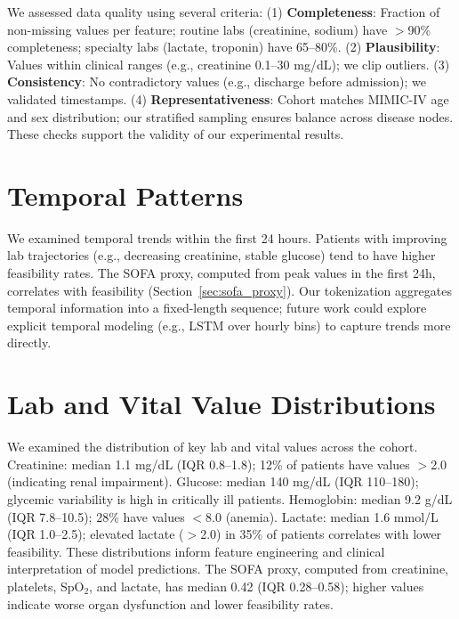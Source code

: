 We assessed data quality using several criteria: (1) \textbf{Completeness}: Fraction of non-missing values per feature; routine labs (creatinine, sodium) have $>$90\% completeness; specialty labs (lactate, troponin) have 65--80\%. (2) \textbf{Plausibility}: Values within clinical ranges (e.g., creatinine 0.1--30 mg/dL); we clip outliers. (3) \textbf{Consistency}: No contradictory values (e.g., discharge before admission); we validated timestamps. (4) \textbf{Representativeness}: Cohort matches MIMIC-IV age and sex distribution; our stratified sampling ensures balance across disease nodes. These checks support the validity of our experimental results.

\section{Temporal Patterns}

We examined temporal trends within the first 24 hours. Patients with improving lab trajectories (e.g., decreasing creatinine, stable glucose) tend to have higher feasibility rates. The SOFA proxy, computed from peak values in the first 24h, correlates with feasibility (Section~\ref{sec:sofa_proxy}). Our tokenization aggregates temporal information into a fixed-length sequence; future work could explore explicit temporal modeling (e.g., LSTM over hourly bins) to capture trends more directly.

\section{Lab and Vital Value Distributions}

We examined the distribution of key lab and vital values across the cohort. Creatinine: median 1.1 mg/dL (IQR 0.8--1.8); 12\% of patients have values $>$2.0 (indicating renal impairment). Glucose: median 140 mg/dL (IQR 110--180); glycemic variability is high in critically ill patients. Hemoglobin: median 9.2 g/dL (IQR 7.8--10.5); 28\% have values $<$8.0 (anemia). Lactate: median 1.6 mmol/L (IQR 1.0--2.5); elevated lactate ($>$2.0) in 35\% of patients correlates with lower feasibility. These distributions inform feature engineering and clinical interpretation of model predictions. The SOFA proxy, computed from creatinine, platelets, SpO$_2$, and lactate, has median 0.42 (IQR 0.28--0.58); higher values indicate worse organ dysfunction and lower feasibility rates.

